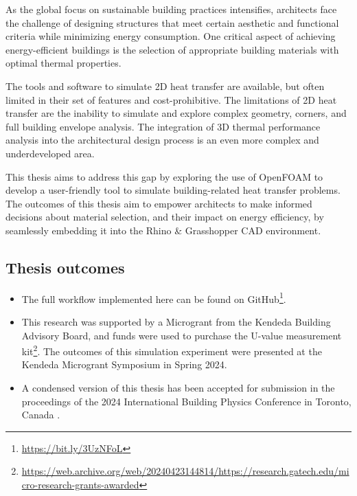 \thispagestyle{empty}
\begin{summary}
\enlargethispage{2em}

As the global focus on sustainable building practices intensifies, architects face the challenge of designing structures that meet certain aesthetic and functional criteria while minimizing energy consumption. 
One critical aspect of achieving energy-efficient buildings is the selection of appropriate building materials with optimal thermal properties. 



The tools and software to simulate 2D heat transfer are available, but often limited in their set of features and cost-prohibitive. The limitations of 2D heat transfer are the inability to simulate and explore complex geometry, corners, and full building envelope analysis.
The integration of 3D thermal performance analysis into the architectural design process is an even more complex and underdeveloped area. 


This thesis aims to address this gap by exploring the use of OpenFOAM to develop a user-friendly tool to simulate building-related heat transfer problems.
The outcomes of this thesis aim to empower architects to make informed decisions about material selection, and their impact on energy efficiency, by seamlessly embedding it into the Rhino \& Grasshopper CAD environment. 

\vspace{-0.5em}

\subsection*{Thesis outcomes}


\begin{itemize}[topsep=0pt,itemsep=0pt,partopsep=0pt, parsep=0pt]

    \item  The full workflow implemented here can be found on GitHub\footnote{\url{https://bit.ly/3UzNFoL}}.

    \item This research was supported by a Microgrant   \cite{kendeda} from the Kendeda Building Advisory Board, and funds were used to purchase the U-value measurement kit\footnote{\url{https://web.archive.org/web/20240423144814/https://research.gatech.edu/micro-research-grants-awarded}}. The outcomes of this simulation experiment were presented at the Kendeda Microgrant Symposium in Spring 2024.
    
    \item A condensed version of this thesis has been accepted for submission in the proceedings of the 2024 International Building Physics Conference in Toronto, Canada \cite{MPIbpc}.
    
    

\end{itemize}

\end{summary} 


